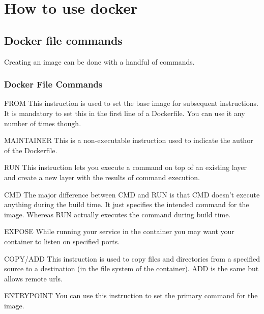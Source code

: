 \documentclass{beamer}
\begin{document}
\section{How to use docker}
\subsection{Docker file commands} 
\begin{frame}
Creating an image can be done with a handful of commands. \tiny \cite{dockerinstructions} 
\small
\frametitle{Docker File Commands}
\begin{block}{FROM}
This instruction is used to set the base image for subsequent instructions. It is mandatory to set this in the first line of a Dockerfile. You can use it any number of times though.
\end{block}

\begin{block}{MAINTAINER}
This is a non-executable instruction used to indicate the author of the Dockerfile.
\end{block}

\begin{block}{RUN}
This instruction lets you execute a command on top of an existing layer and create a new layer with the results of command execution.
\end{block}

\end{frame}
\begin{frame}
\small
\begin{block}{CMD}
The major difference between CMD and RUN is that CMD doesn’t execute anything during the build time. It just specifies the intended command for the image. Whereas RUN actually executes the command during build time.
\end{block}

\begin{block}{EXPOSE}
While running your service in the container you may want your container to listen on specified ports. 
\end{block}

\begin{block}{COPY/ADD}
This instruction is used to copy files and directories from a specified source to a destination (in the file system of the container).
ADD is the same but allows remote urls.
\end{block}

\begin{block}{ENTRYPOINT}
You can use this instruction to set the primary command for the image.
\end{block}

\end{frame}
\end{document}
